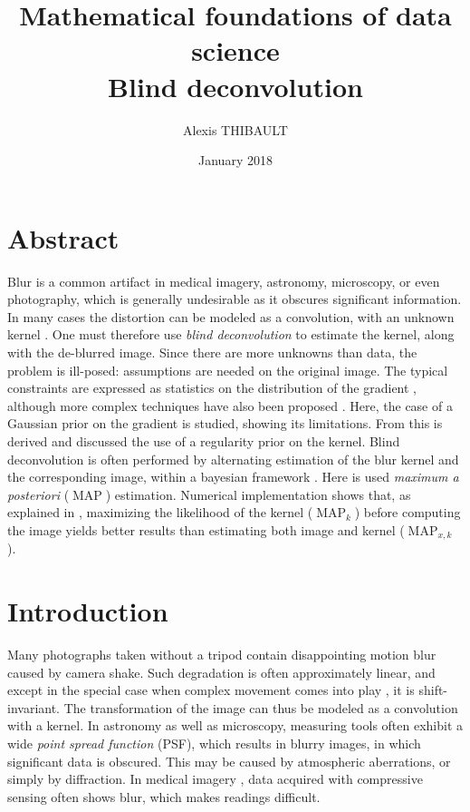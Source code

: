 \documentclass[english,a4paper]{article}
\title{Mathematical foundations of data science\\
Blind deconvolution}
\date{January 2018}
\author{Alexis THIBAULT}
\theoremstyle{plain}
\theoremstyle{definition}
\theoremstyle{remark}
\DeclareMathOperator{\MAP}{MAP}
\begin{document}
\maketitle

\section{Abstract}
Blur is a common artifact in medical imagery, astronomy, microscopy, or even photography, which is generally undesirable as it obscures significant information.
In many cases the distortion can be modeled as a convolution, with an unknown kernel \cite{fergus2006removing,cho2009fast,cho2010motion,jia2007single,xu2010two}. One must therefore use \emph{blind deconvolution} to estimate the kernel, along with the de-blurred image.
Since there are more unknowns than data, the problem is ill-posed: assumptions are needed on the original image. The typical constraints are expressed as statistics on the distribution of the gradient \cite{joshi2008psf,krishnan2009fast,levi2009using,levin2007blind}, although more complex techniques have also been proposed \cite{miskin2000ensemble,jalobeanu2002satellite}. 
Here, the case of a Gaussian prior on the gradient is studied, showing its limitations. From this is derived and discussed the use of a regularity prior on the kernel.
Blind deconvolution is often performed by alternating estimation of the blur kernel and the corresponding image, within a bayesian framework \cite{richardson1972bayesian,levin2007blind,levin2009understanding,levin2011efficient,krishnan2009fast,joshi2008psf,jia2007single,levi2009using}.
Here is used \emph{maximum a posteriori} ($\MAP$) estimation. Numerical implementation shows that, as explained in \cite{levin2011efficient}, maximizing the likelihood of the kernel ($\MAP_k$) before computing the image yields better results than estimating both image and kernel ($\MAP_{x,k}$).




\section{Introduction}
Many photographs taken without a tripod contain disappointing motion blur caused by camera shake. Such degradation is often approximately linear, and except in the special case when complex movement comes into play \cite{shan2007rotational,whyte2012non}, it is shift-invariant. The transformation of the image can thus be modeled as a convolution with a kernel.
In astronomy as well as microscopy, measuring tools often exhibit a wide \emph{point spread function} (PSF), which results in blurry images, in which significant data is obscured. This may be caused by atmospheric aberrations, or simply by diffraction.
In medical imagery \cite{chen2016compressive}, data acquired with compressive sensing often shows blur, which makes readings difficult.
\end{document}
